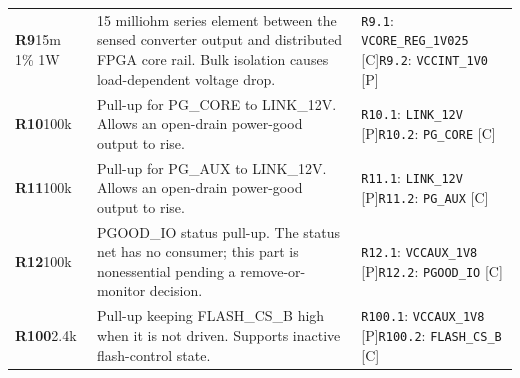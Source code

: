\documentclass[11pt,a4paper]{article}
\begin{document}
\begin{longtable}{@{}P{27mm}P{83mm}P{58mm}@{}}
\textbf{R9}\newline 15m 1\% 1W & 15 milliohm series element between the sensed converter output and distributed FPGA core rail. Bulk isolation causes load-dependent voltage drop. & \nolinkurl{R9.1}: \nolinkurl{VCORE_REG_1V025} [C]\newline \nolinkurl{R9.2}: \nolinkurl{VCCINT_1V0} [P] \\
\textbf{R10}\newline 100k & Pull-up for PG\_CORE to LINK\_12V. Allows an open-drain power-good output to rise. & \nolinkurl{R10.1}: \nolinkurl{LINK_12V} [P]\newline \nolinkurl{R10.2}: \nolinkurl{PG_CORE} [C] \\
\textbf{R11}\newline 100k & Pull-up for PG\_AUX to LINK\_12V. Allows an open-drain power-good output to rise. & \nolinkurl{R11.1}: \nolinkurl{LINK_12V} [P]\newline \nolinkurl{R11.2}: \nolinkurl{PG_AUX} [C] \\
\textbf{R12}\newline 100k & PGOOD\_IO status pull-up. The status net has no consumer; this part is nonessential pending a remove-or-monitor decision. & \nolinkurl{R12.1}: \nolinkurl{VCCAUX_1V8} [P]\newline \nolinkurl{R12.2}: \nolinkurl{PGOOD_IO} [C] \\
\textbf{R100}\newline 2.4k & Pull-up keeping FLASH\_CS\_B high when it is not driven. Supports inactive flash-control state. & \nolinkurl{R100.1}: \nolinkurl{VCCAUX_1V8} [P]\newline \nolinkurl{R100.2}: \nolinkurl{FLASH_CS_B} [C] \\

\end{longtable}
\end{document}
